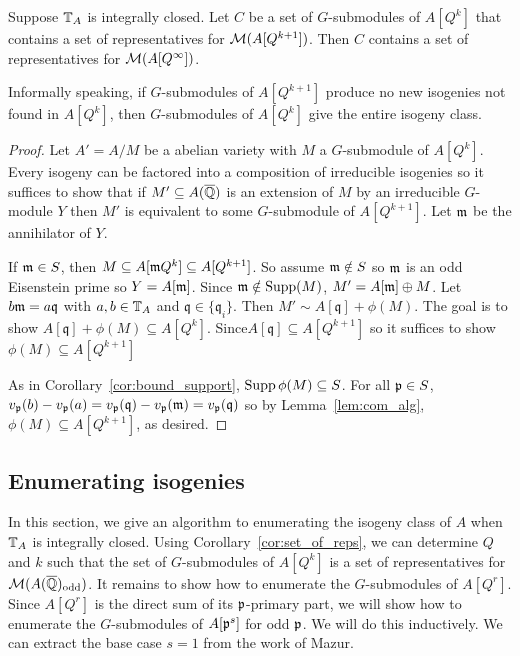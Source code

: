 \documentclass{article}
\renewcommand{\q}{\mathfrak{q}}
\newcommand{\odd}{\mathrm{odd}}
\begin{document}
\begin{corollary}%
    \label{cor:set_of_reps}
    Suppose $\mathbb{T}_A$ is integrally closed. Let $C$ be a set of $G$-submodules of
    $A[Q^k]$ that contains a set of representatives for $\mathcal{M}(A[Q^{k+1}])$. Then
    $C$ contains a set of representatives for $\mathcal{M}(A[Q^\infty])$.
    
    Informally speaking, if $G$-submodules of $A[Q^{k+1}]$ produce no new
    isogenies not found in $A[Q^k]$, then $G$-submodules of $A[Q^k]$ give the
    entire isogeny class.
\end{corollary}
\begin{proof}
    Let $A'=A/M$ be a abelian variety with $M$ a $G$-submodule of $A[Q^k]$.
    Every isogeny can be factored into a composition of irreducible isogenies
    so it suffices to show that if $M'\subseteq A(\overline{\mathbb{Q}})$ is an extension of
    $M$ by an irreducible $G$-module $Y$ then $M'$ is equivalent to some
    $G$-submodule of $A[Q^{k+1}]$. Let $\mathfrak{m}$ be the annihilator of $Y$. 
    
    If $\mathfrak{m}\in S$, then $M\subseteq A[\mathfrak{m} Q^k]\subseteq A[Q^{k+1}]$. So assume
    $\mathfrak{m}\notin S$ so $\mathfrak{m}$ is an odd Eisenstein prime so $Y=A[\mathfrak{m}]$. Since
    $\mathfrak{m}\notin \operatorname{Supp}(M)$, $M' = A[\mathfrak{m}]\oplus M$. Let $b\m=a\q$ with $a,b\in
    \mathbb{T}_A$ and $\q\in \{\q_i\}$. Then $M'\sim A[\q] + \phi(M)$. The goal is to
    show $A[\q]+\phi(M)\subseteq A[Q^k]$. Since$A[\q]\subseteq
    A[Q^{k+1}]$ so it suffices to show $\phi(M)\subseteq A[Q^{k+1}]$
    
    As in Corollary~\ref{cor:bound_support}, $\operatorname{Supp}\phi(M)\subseteq S$. For all
    $\mathfrak{p}\in S$, $v_\p(b)-v_\p(a) = v_\p(\q)-v_\p(\m)=v_\p(\q)$ so by
    Lemma~\ref{lem:com_alg}, $\phi(M)\subseteq A[Q^{k+1}]$, as desired.
\end{proof}

\subsection{Enumerating isogenies}%
\label{sub:enumerating_isogenies}

In this section, we give an algorithm to enumerating the isogeny class of $A$
when $\mathbb{T}_A$ is integrally closed. Using Corollary~\ref{cor:set_of_reps}, we
can determine $Q$ and $k$ such that the set of $G$-submodules of $A[Q^k]$ is a
set of representatives for $\M(A(\QQbar)_\odd)$. It remains to show how to
enumerate the $G$-submodules of $A[Q^r]$. Since $A[Q^r]$ is the direct sum of
its $\mathfrak{p}$-primary part, we will show how to enumerate the $G$-submodules of
$A[\mathfrak{p}^s]$ for odd $\mathfrak{p}$. We will do this inductively. We can extract the base
case $s=1$ from the work of Mazur.
\end{document}
